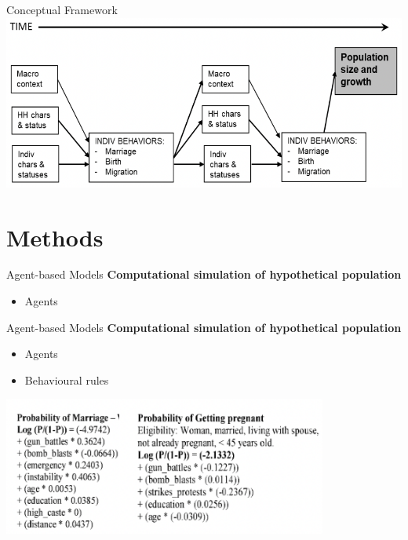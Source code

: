 \documentclass{beamer}
\begin{document}
		\begin{frame}{Conceptual Framework}
			\includegraphics[width=\linewidth]{Images/con2.png}
		\end{frame}

	\section{Methods}

		\begin{frame}{Agent-based Models}
			\textbf{Computational simulation of hypothetical population}
			\begin{itemize}
				\item Agents
			\end{itemize}
		\end{frame}


		\begin{frame}{Agent-based Models}
			\textbf{Computational simulation of hypothetical population}
			\begin{itemize}
				\item Agents
				\item Behavioural rules
			\end{itemize}
			
			\includegraphics[width=0.8\textwidth]{Images/method1.png}
		\end{frame}
\end{document}
